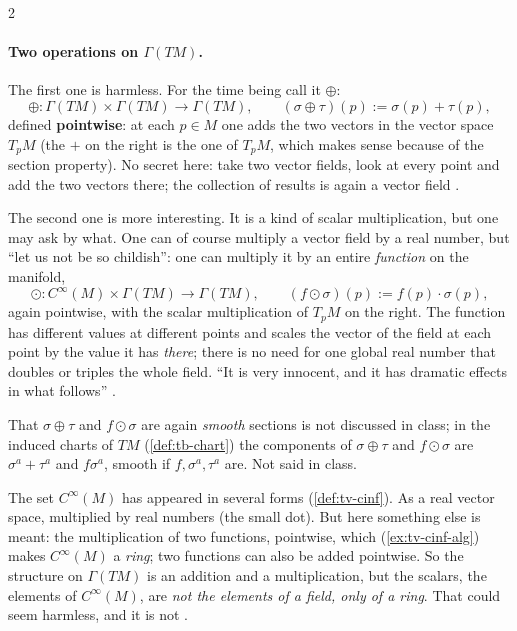 \begin{paracol}{2}
\paragraph{Two operations on $\Gamma(TM)$.} The first one is harmless. For the time being call it $\oplus$:
\[
  \oplus\colon\Gamma(TM)\times\Gamma(TM)\to\Gamma(TM),\qquad(\sigma\oplus\tau)(p):=\sigma(p)+\tau(p),
\]
defined \textbf{pointwise}: at each $p\in M$ one adds the two vectors in the vector space $T_pM$ (the $+$ on the right is the one of $T_pM$, which makes sense because of the section property). No secret here: take two vector fields, look at every point and add the two vectors there; the collection of results is again a vector field
   .

The second one is more interesting. It is a kind of scalar multiplication, but one may ask by what. One can of course multiply a vector field by a real number, but ``let us not be so childish'': one can multiply it by an entire \emph{function} on the manifold,
\[
  \odot\colon C^\infty(M)\times\Gamma(TM)\to\Gamma(TM),\qquad(f\odot\sigma)(p):=f(p)\cdot\sigma(p),
\]
again pointwise, with the scalar multiplication of $T_pM$ on the right. The function has different values at different points and scales the vector of the field at each point by the value it has \emph{there}; there is no need for one global real number that doubles or triples the whole field. ``It is very innocent, and it has
dramatic effects in what follows''      .
\begin{coursenote}
That $\sigma\oplus\tau$ and $f\odot\sigma$ are again \emph{smooth} sections is not discussed in class; in the induced charts of $TM$ (\cref{def:tb-chart}) the components of $\sigma\oplus\tau$ and $f\odot\sigma$ are $\sigma^a+\tau^a$ and $f\sigma^a$, smooth if $f,\sigma^a,\tau^a$ are. Not said in class.
\end{coursenote}

The set $C^\infty(M)$ has appeared in several forms (\cref{def:tv-cinf}). As a real vector space, multiplied by real numbers (the small dot). But here something else is meant: the multiplication of two functions, pointwise, which (\cref{ex:tv-cinf-alg}) makes $C^\infty(M)$ a \emph{ring}; two functions can also be added pointwise. So the structure on $\Gamma(TM)$ is an
addition and a multiplication, but the scalars, the elements of $C^\infty(M)$, are \emph{not the elements of a field, only of a ring}. That could seem harmless, and it is not       .


\end{paracol}
